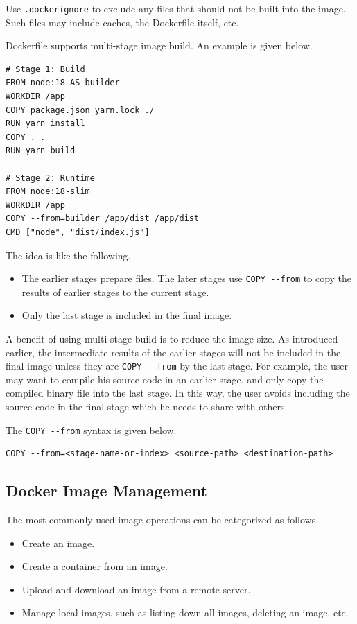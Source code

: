 Use \verb|.dockerignore| to exclude any files that should not be built into the image. Such files may include caches, the Dockerfile itself, etc.

Dockerfile supports multi-stage image build. An example is given below.
\begin{lstlisting}
# Stage 1: Build
FROM node:18 AS builder
WORKDIR /app
COPY package.json yarn.lock ./
RUN yarn install
COPY . .
RUN yarn build

# Stage 2: Runtime
FROM node:18-slim
WORKDIR /app
COPY --from=builder /app/dist /app/dist
CMD ["node", "dist/index.js"]
\end{lstlisting}

The idea is like the following.
\begin{itemize}
  \item The earlier stages prepare files. The later stages use \verb|COPY --from| to copy the results of earlier stages to the current stage.
  \item Only the last stage is included in the final image.
\end{itemize}

A benefit of using multi-stage build is to reduce the image size. As introduced earlier, the intermediate results of the earlier stages will not be included in the final image unless they are \verb|COPY --from| by the last stage. For example, the user may want to compile his source code in an earlier stage, and only copy the compiled binary file into the last stage. In this way, the user avoids including the source code in the final stage which he needs to share with others.

The \verb|COPY --from| syntax is given below.
\begin{lstlisting}
COPY --from=<stage-name-or-index> <source-path> <destination-path>
\end{lstlisting}









\subsection{Docker Image Management}

The most commonly used image operations can be categorized as follows.
\begin{itemize}
  \item Create an image.
  \item Create a container from an image.
  \item Upload and download an image from a remote server.
  \item Manage local images, such as listing down all images, deleting an image, etc.
\end{itemize}

